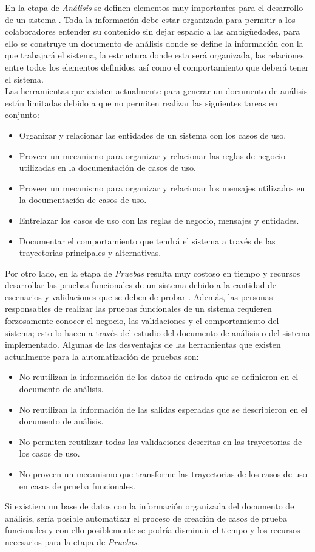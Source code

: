 	En la etapa de {\it Análisis} se definen elementos muy importantes para el desarrollo de un sistema \cite{kendall2005analisis}. Toda la información debe estar organizada para permitir a los colaboradores entender su contenido sin dejar espacio a las ambigüedades, para ello se construye un documento de análisis donde se define la información con la que trabajará el sistema, la estructura donde esta será organizada, las relaciones entre todos los elementos definidos, así como el comportamiento que deberá tener el sistema.\\

Las herramientas que existen actualmente para generar un documento de análisis están limitadas debido a que no permiten realizar las siguientes tareas en conjunto:
\begin{itemize}
 \item Organizar y relacionar las entidades de un sistema con los casos de uso.
 \item Proveer un mecanismo para organizar y relacionar las reglas de negocio utilizadas en la documentación de casos de uso.
 \item Proveer un mecanismo para organizar y relacionar los mensajes utilizados en la documentación de casos de uso.
 \item Entrelazar los casos de uso con las reglas de negocio, mensajes y entidades. 
 \item Documentar el comportamiento que tendrá el sistema a través de las trayectorias principales y alternativas.
\end{itemize}

	Por otro lado, en la etapa de {\it Pruebas} resulta muy costoso en tiempo y recursos desarrollar las pruebas funcionales de un sistema debido a la cantidad de escenarios y validaciones que se deben de probar \cite{pressman2005software}. Además, las personas responsables de realizar las pruebas funcionales de un sistema requieren forzosamente conocer el negocio, las validaciones y el comportamiento del sistema; esto lo hacen a través del estudio del documento de análisis o del sistema implementado. 
	Algunas de las desventajas de las herramientas que existen actualmente para la automatización de pruebas son:
	
\begin{itemize}
 \item No reutilizan la información de los datos de entrada que se definieron en el documento de análisis.
 \item No reutilizan la información de las salidas esperadas que se describieron en el documento de análisis.
 \item No permiten reutilizar todas las validaciones descritas en las trayectorias de los casos de uso.
 \item No proveen un mecanismo que transforme las trayectorias de los casos de uso en casos de prueba funcionales.
\end{itemize}

Si existiera un base de datos con la información organizada del documento de análisis, sería posible automatizar el proceso de creación de casos de prueba funcionales y con ello posiblemente se podría disminuir el tiempo y los recursos necesarios para la etapa de {\it Pruebas}.